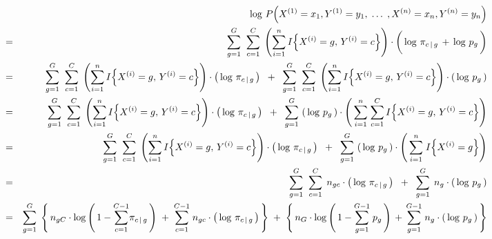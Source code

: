 \begin{eqnarray*}
&&
	\log\,P\!\left(X^{(1)} = x_{1},Y^{(1)}=y_{1}, \;\ldots\; ,X^{(n)} = x_{n},Y^{(n)}=y_{n}\right)
\\
&=&
	\overset{G}{\underset{g=1}{\sum}} \;\; \overset{C}{\underset{c=1}{\sum}} \;
	\left(\overset{n}{\underset{i=1}{\sum}}\,I\!\left\{X^{(i)}=g,\,Y^{(i)}=c\right\}\right)
	\cdot
	\left(\,\log\,\pi_{c\,\vert\,g} \,\overset{{\color{white}\vert}}{+}\, \log\,p_{g}\,\right)
\\
&=&
	\overset{G}{\underset{g=1}{\sum}} \;\; \overset{C}{\underset{c=1}{\sum}} \;
	\left(\overset{n}{\underset{i=1}{\sum}}\,I\!\left\{X^{(i)}=g,\,Y^{(i)}=c\right\}\right)
	\cdot
	\left(\,\log\,\pi_{c\,\vert\,g}\,\right)
	\;\; + \;\;
	\overset{G}{\underset{g=1}{\sum}} \;\; \overset{C}{\underset{c=1}{\sum}} \;
	\left(\overset{n}{\underset{i=1}{\sum}}\,I\!\left\{X^{(i)}=g,\,Y^{(i)}=c\right\}\right)
	\cdot
	\left(\,\log\,p_{g}\,\right)
\\
&=&
	\overset{G}{\underset{g=1}{\sum}} \;\; \overset{C}{\underset{c=1}{\sum}} \;
	\left(\overset{n}{\underset{i=1}{\sum}}\,I\!\left\{X^{(i)}=g,\,Y^{(i)}=c\right\}\right)
	\cdot
	\left(\,\log\,\pi_{c\,\vert\,g}\,\right)
	\;\; + \;\;
	\overset{G}{\underset{g=1}{\sum}} \, \left(\,\log\,p_{g}\,\right)
	\cdot
	\left(\,
		\overset{n}{\underset{i=1}{\sum}} \;
		\overset{C}{\underset{c=1}{\sum}} \,
		I\!\left\{X^{(i)}=g,\,Y^{(i)}=c\right\}
	\right)
\\
&=&
	\overset{G}{\underset{g=1}{\sum}} \;\; \overset{C}{\underset{c=1}{\sum}} \;
	\left(\overset{n}{\underset{i=1}{\sum}}\,I\!\left\{X^{(i)}=g,\,Y^{(i)}=c\right\}\right)
	\cdot
	\left(\,\log\,\pi_{c\,\vert\,g}\,\right)
	\;\; + \;\;
	\overset{G}{\underset{g=1}{\sum}} \, \left(\,\log\,p_{g}\,\right)
	\cdot
	\left(\, \overset{n}{\underset{i=1}{\sum}} \; I\!\left\{X^{(i)}=g\right\} \right)
\\
&=&
	\overset{G}{\underset{g=1}{\sum}} \;\; \overset{C}{\underset{c=1}{\sum}} \;\,
	n_{gc} \cdot \left(\,\log\,\pi_{c\,\vert\,g}\,\right)
	\;\; + \;\;
	\overset{G}{\underset{g=1}{\sum}} \;\, n_{g} \cdot \left(\,\log\,p_{g}\,\right)
\\
&=&
	\overset{G}{\underset{g=1}{\sum}} \;
	\left\{\,
		n_{gC}
		\cdot
		\log\left(\,1 - \overset{C-1}{\underset{c=1}{\sum}}\pi_{c\,\vert\,g}\,\right)
		\; + \;
		\overset{C-1}{\underset{c=1}{\sum}} \; n_{gc}
		\cdot
		\left(\,\log\,\pi_{c\,\vert\,g}\,\right)
	\,\right\}
	\; + \;
	\left\{\,
		n_{G}
		\cdot
		\log\left(\,1 - \overset{G-1}{\underset{g=1}{\sum}}\;p_{g}\,\right)
		\, + \,
		\overset{G-1}{\underset{g=1}{\sum}} \; n_{g}
		\cdot
		\left(\,\log\,p_{g}\,\right)
	\,\right\}
\end{eqnarray*}
